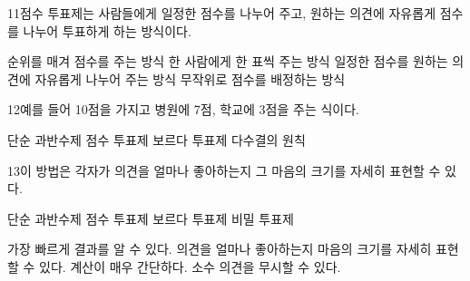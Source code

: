 \documentclass[fs85,seriesRus]{korfarm-base}
\begin{document}
\begin{kfSentenceUnit}{11}{점수 투표제는 사람들에게 일정한 점수를 나누어 주고, 원하는 의견에 자유롭게 점수를 나누어 투표하게 하는 방식이다.}
\begin{kfChoices}
\kfChoice 순위를 매겨 점수를 주는 방식
\kfChoice 한 사람에게 한 표씩 주는 방식
\kfChoice 일정한 점수를 원하는 의견에 자유롭게 나누어 주는 방식
\kfChoice 무작위로 점수를 배정하는 방식
\end{kfChoices}
\end{kfSentenceUnit}

\begin{kfSentenceUnit}{12}{예를 들어 10점을 가지고 병원에 7점, 학교에 3점을 주는 식이다.}
\begin{kfChoices}
\kfChoice 단순 과반수제
\kfChoice 점수 투표제
\kfChoice 보르다 투표제
\kfChoice 다수결의 원칙
\end{kfChoices}
\end{kfSentenceUnit}

\begin{kfSentenceUnit}{13}{이 방법은 각자가 의견을 얼마나 좋아하는지 그 마음의 크기를 자세히 표현할 수 있다.}
\begin{kfChoices}
\kfChoice 단순 과반수제
\kfChoice 점수 투표제
\kfChoice 보르다 투표제
\kfChoice 비밀 투표제
\end{kfChoices}
\begin{kfChoices}
\kfChoice 가장 빠르게 결과를 알 수 있다.
\kfChoice 의견을 얼마나 좋아하는지 마음의 크기를 자세히 표현할 수 있다.
\kfChoice 계산이 매우 간단하다.
\kfChoice 소수 의견을 무시할 수 있다.
\end{kfChoices}
\end{kfSentenceUnit}
\end{document}
